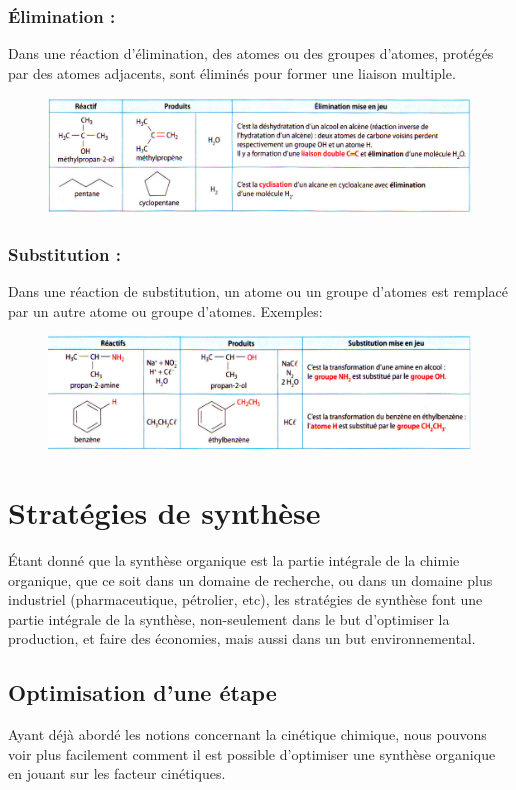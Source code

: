 \documentclass[11pt,a4paper]{article}
\begin{document}
\subsubsection*{Élimination : }
Dans une réaction d’élimination, des atomes ou des groupes d’atomes, protégés par des atomes adjacents, sont éliminés pour former une liaison multiple. 
\begin{figure}[H]
    \centering
    \includegraphics[width=0.8\linewidth]{imgs/c5/elimination.jpg}
\end{figure}
\subsubsection*{Substitution : }
Dans une réaction de substitution, un atome ou un groupe d’atomes est remplacé par un autre atome ou groupe d’atomes. Exemples: 
\begin{figure}[H]
    \centering
    \includegraphics[width=0.8\linewidth]{imgs/c5/substitute.jpg}
\end{figure} 

\section{Stratégies de synthèse}
Étant donné que la synthèse organique est la partie intégrale de la chimie organique, que ce soit dans un domaine de recherche, ou dans un domaine plus industriel (pharmaceutique, pétrolier, etc), les stratégies de synthèse font une partie intégrale de la synthèse, non-seulement dans le but d'optimiser la production, et faire des économies, mais aussi dans un but environnemental. 

\subsection{Optimisation d'une étape}
Ayant déjà abordé les notions concernant la cinétique chimique, nous pouvons voir plus facilement comment il est possible d'optimiser une synthèse organique en jouant sur les facteur cinétiques. 
\end{document}
